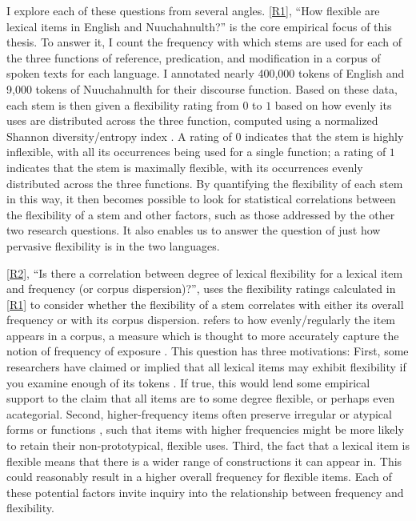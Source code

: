 I explore each of these questions from several angles. \ref{R1}, \enquote{How flexible are lexical items in English and Nuuchahnulth?} is the core empirical focus of this thesis. To answer it, I count the frequency with which stems are used for each of the three functions of reference, predication, and modification in a corpus of spoken texts for each language. I annotated nearly 400,000 tokens of English and 9,000 tokens of Nuuchahnulth for their discourse function. Based on these data, each stem is then given a flexibility rating from $0$ to $1$ based on how evenly its uses are distributed across the three function, computed using a normalized Shannon diversity/entropy index \parencite{Shannon1948}. A rating of $0$ indicates that the stem is highly inflexible, with all its occurrences being used for a single function; a rating of $1$ indicates that the stem is maximally flexible, with its occurrences evenly distributed across the three functions. By quantifying the flexibility of each stem in this way, it then becomes possible to look for statistical correlations between the flexibility of a stem and other factors, such as those addressed by the other two research questions. It also enables us to answer the question of just how pervasive flexibility is in the two languages.

\ref{R2}, \enquote{Is there a correlation between degree of lexical flexibility for a lexical item and frequency (or corpus dispersion)?}, uses the flexibility ratings calculated in \ref{R1} to consider whether the flexibility of a stem correlates with either its overall frequency or with its corpus dispersion.  refers to how evenly/regularly the item appears in a corpus, a measure which is thought to more accurately capture the notion of frequency of exposure \parencites{Gries2008}{Griesfc}. This question has three motivations: First, some researchers have claimed or implied that all lexical items may exhibit flexibility if you examine enough of its tokens \parencite[77]{MoselHovdhaugen1992}. If true, this would lend some empirical support to the claim that all items are to some degree flexible, or perhaps even acategorial. Second, higher-frequency items often preserve irregular or atypical forms or functions \parencite[Ch.~13]{Bybee2007}, such that items with higher frequencies might be more likely to retain their non-prototypical, flexible uses. Third, the fact that a lexical item is flexible means that there is a wider range of constructions it can appear in. This could reasonably result in a higher overall frequency for flexible items. Each of these potential factors invite inquiry into the relationship between frequency and flexibility.

